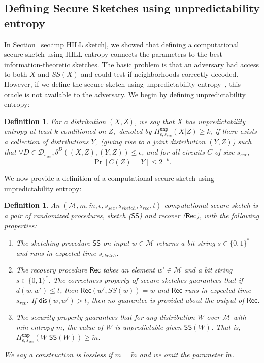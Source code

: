 \documentclass[11pt]{article}
\newcommand{\secref}[1]{\mbox{Section~\ref{#1}}}
\newcommand{\class}[1]{{\ensuremath{\mathsf{#1}}}}
\newcommand{\sketch}{\ensuremath{\class{SS}}\xspace}
\newcommand{\rec}{\ensuremath{\class{Rec}}\xspace}
\newcommand{\dis}{\ensuremath{\mathsf{dis}}}
\newcommand{\unp}{\ensuremath{\mathtt{unp}}\xspace}
\newtheorem{definition}[theorem]{Definition}
\begin{document}
\subsection{Defining Secure Sketches using unpredictability entropy}
\label{sec:unp secure sketch}
In \secref{sec:imp HILL sketch}, we showed that defining a computational secure sketch using HILL entropy connects the parameters to the best information-theoretic sketches.  The basic problem is that an adversary had access to both $X$ and $SS(X)$ and could test if neighborhoods correctly decoded.  However, if we define the secure sketch using unpredictability entropy~\cite[Section 5]{DBLP:conf/eurocrypt/HsiaoLR07}, this oracle is not available to the adversary.  We begin by defining unpredictability entropy:

\begin{definition}
\label{def:unp entropy}
For a distribution $(X, Z)$, we say that $X$ has unpredictability entropy at least $k$ conditioned on $Z,$ denoted by $H^{\unp}_{\epsilon, s_{sec}} (X|Z) \geq k$, if there exists a collection of distributions $Y_z$ (giving rise to a joint distribution $(Y, Z)$) such that $\forall D\in \mathcal{D}_{s_{sec}}, \delta^D((X, Z),(Y, Z))\leq \epsilon$, and for all circuits $C$ of size $s_{sec}$,
\[
\Pr[C(Z) = Y ] \leq 2^{-k}
.\]
\end{definition}
We now provide a definition of a computational secure sketch using unpredictability entropy:
\begin{definition}\label{def:comp secure sketch}
An $(\mathcal{M},m, \tilde{m}, \epsilon, s_{sec}, s_{sketch}, s_{rec}, t)$-\emph{computational secure sketch} is a pair of randomized procedures, sketch (\sketch) and recover (\rec), with the following properties:
\begin{enumerate}
\item The sketching procedure \sketch on input $w\in\mathcal{M}$ returns a bit string $s\in\{0,1\}^*$ and runs in expected time $s_{sketch}$.
\item The recovery procedure \rec takes an element $w'\in\mathcal{M}$ and a bit string $s\in\{0,1\}^*$.  The \emph{correctness} property of secure sketches guarantees that if $d(w,w')\leq t$, then $\rec(w',SS(w))=w$ and \rec runs in expected time $s_{rec}$.  If $\dis(w,w')>t$, then no guarantee is provided about the output of \rec.  
\item The \emph{security} property guarantees that for any distribution $W$ over $\mathcal{M}$ with min-entropy $m$, the value of $W$ is unpredictable given $\sketch(W)$.  That is, $H^{\unp}_{\epsilon, s_{sec}}(W|\sketch(W))\geq \tilde{m}$.
\end{enumerate}
We say a construction is \emph{lossless} if $m=\tilde{m}$ and we omit the parameter $\tilde{m}$.
\end{definition}
\end{document}
